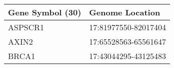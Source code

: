 \begin{tabular}{ll}
\toprule
Gene Symbol (30) &      Genome Location \\
\midrule
         ASPSCR1 & 17:81977550-82017404 \\
           AXIN2 & 17:65528563-65561647 \\
           BRCA1 & 17:43044295-43125483 \\
\bottomrule
\end{tabular}
